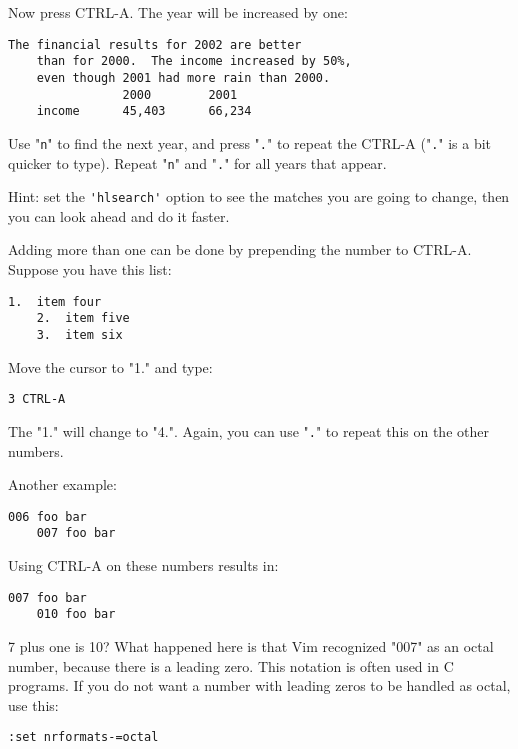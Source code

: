 Now press CTRL-A.
The year will be increased by one:

\begin{Verbatim}[samepage=true]
    The financial results for 2002 are better 
    than for 2000.  The income increased by 50%, 
    even though 2001 had more rain than 2000. 
                2000        2001 
    income      45,403      66,234 
\end{Verbatim}

Use "\verb!n!" to find the next year, and press "\verb!.!" to repeat the CTRL-A ("\verb!.!" is a bit quicker to type).
Repeat "\verb!n!" and "\verb!.!" for all years that appear.

Hint: set the \verb!'hlsearch'! option to see the matches you are going to change, then you can look ahead and do it faster.

Adding more than one can be done by prepending the number to CTRL-A.
Suppose you have this list:

\begin{Verbatim}[samepage=true]
    1.  item four 
    2.  item five 
    3.  item six 
\end{Verbatim}

Move the cursor to "1." and type:

\begin{Verbatim}[samepage=true]
 3 CTRL-A
\end{Verbatim}

The "1." will change to "4.".
Again, you can use "\verb!.!" to repeat this on the other numbers.

Another example:

\begin{Verbatim}[samepage=true]
    006 foo bar 
    007 foo bar 
\end{Verbatim}

Using CTRL-A on these numbers results in:

\begin{Verbatim}[samepage=true]
    007 foo bar 
    010 foo bar 
\end{Verbatim}

7 plus one is 10?  What happened here is that Vim recognized "007" as an octal number, because there is a leading zero.
This notation is often used in C programs.
If you do not want a number with leading zeros to be handled as octal, use this:

\begin{Verbatim}[samepage=true]
 :set nrformats-=octal
\end{Verbatim}

